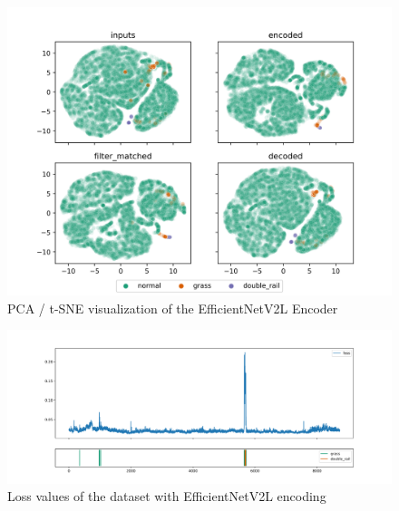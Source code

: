 \begin{figure}[!ht]
    \centering
    \includegraphics[width=\textwidth,trim={0 1cm 0 1cm},clip]{./results/efficientnetv2l_vgg19/20230525_194238_feature_vectors_1.png}
    \caption{PCA / t-SNE visualization of the EfficientNetV2L Encoder}
    \label{fig:efficientnetv2l_pca}
\end{figure}



\begin{figure}[!ht]
    \centering
    \includegraphics[width=\textwidth,trim={0 1cm 0 1cm},clip]{./results/efficientnetv2l_vgg19/20230525_194238_feature_vectors_loss.png}
    \caption{Loss values of the dataset with EfficientNetV2L encoding}
    \label{fig:efficientnetv2l_loss}
\end{figure}



